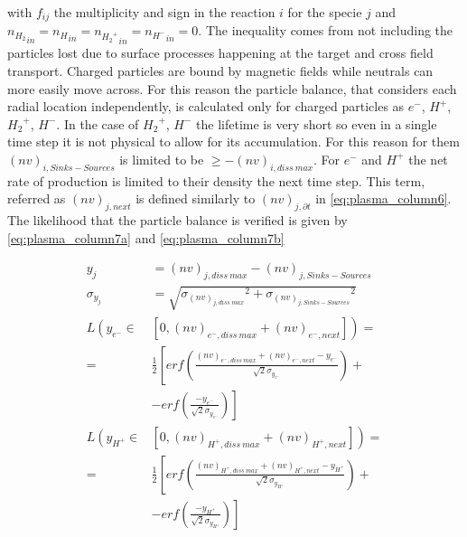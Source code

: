 with $f_{ij}$ the multiplicity and sign in the reaction $i$ for the specie $j$ and ${n_{{H_2}}}_{in}={n_{{H}}}_{in}={n_{{H_2}^+}}_{in}={n_{H^-}}_{in} =0$. The inequality comes from not including the particles lost due to surface processes happening at the target and cross field transport. Charged particles are bound by magnetic fields while neutrals can more easily move across. For this reason the particle balance, that considers each radial location independently, is calculated only for charged particles as $e^-$, $H^+$, ${H_2}^+$, $H^-$.
In the case of ${H_2}^+$, $H^-$ the lifetime is very short so even in a single time step it is not physical to allow for its accumulation.\cite{Verhaegh2018} For this reason for them $(nv)_{i, Sinks-Sources}$ is limited to be $\geq -(nv)_{i, diss \: max}$. For $e^-$ and $H^+$ the net rate of production is limited to their density the next time step. This term, referred as $(nv)_{j,next}$ is defined similarly to $(nv)_{j,\partial t}$ in \autoref{eq:plasma_column6}. The likelihood that the particle balance is verified is given by \autoref{eq:plasma_column7a} and \ref{eq:plasma_column7b}

\begin{equation}
\label{eq:plasma_column7a}
\begin{aligned}
y_j &= (nv)_{j, diss \: max} - (nv)_{j, Sinks-Sources} \\ {\sigma}_{y_j} &=\sqrt{{{\sigma}_{(nv)_{j, diss \: max}}}^2 + {{\sigma}_{(nv)_{j, Sinks-Sources}}}^2 }
\\
L\left(y_{e^-{}} \in \right. & \left. [0,(nv)_{e^-, diss \: max}+(nv)_{e^-, next}]\right) =\\=& \frac{1}{2} \left[ erf \left(\frac{(nv)_{e^-, diss \: max}+(nv)_{e^-, next}-y_{e^-}}{\sqrt{2} {\sigma}_{y_{e^-}} } \right) \right. +\\ &-\left. erf \left( \frac{-y_{e^-{}}}{\sqrt{2} {\sigma}_{y_{e^-{}}} } \right) \right]
\\
L\left(y_{H^+{}} \in \right. & \left. [0,(nv)_{H^+{}, diss \: max}+(nv)_{H^+{}, next}]\right) =\\=& \frac{1}{2} \left[ erf \left(\frac{(nv)_{H^+{}, diss \: max}+(nv)_{H^+{}, next}-y_{H^+{}}}{\sqrt{2} {\sigma}_{y_{H^+{}}} } \right) \right. +\\ &-\left. erf \left( \frac{-y_{H^+{}}}{\sqrt{2} {\sigma}_{y_{H^+{}}} } \right) \right]
\end{aligned}
\end{equation}

